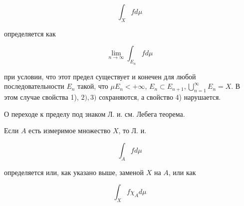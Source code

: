 \documentclass[10pt]{article}
\begin{document}
\[

\int_{X} f d \mu

\]



определяется как



\[

\lim _{n \rightarrow \infty} \int_{E_{n}} f d \mu

\]



при условии, что этот предел существует и конечен для любой последовательности $E_{n}$ такой, что $\mu E_{n}<+\infty$, $E_{n} \subset E_{n+1}, \bigcup_{n=1}^{\infty} E_{n}=X$. В этом случае свойства 1), $2), 3)$ сохраняются, а свойство 4) нарушается.



О переходе к пределу под знаком Л. и. см. Лебега теорема.



Если $A$ есть измеримое множество $X$, то Л. и.



\[

\int_{A} f d \mu

\]



определяется или, как указано выше, заменой $X$ на $A$, или как



\[

\int_{X} f \chi_{A} d \mu

\]
\end{document}
